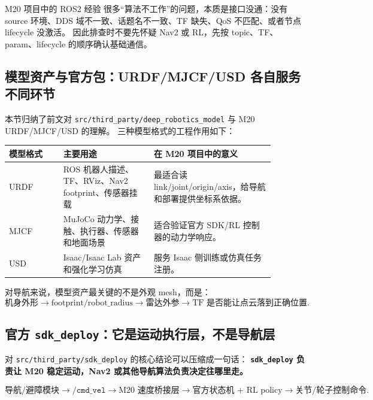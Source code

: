 \documentclass[UTF8,11pt,a4paper]{ctexart}
\begin{document}
\begin{orangebox}{M20 项目中的 ROS2 经验}
很多“算法不工作”的问题，本质是接口没通：没有 source 环境、DDS 域不一致、话题名不一致、TF 缺失、QoS 不匹配、或者节点 lifecycle 没激活。
因此排查时不要先怀疑 Nav2 或 RL，先按 topic、TF、param、lifecycle 的顺序确认基础通信。
\end{orangebox}

\subsection{模型资产与官方包：URDF/MJCF/USD 各自服务不同环节}

本节归纳了前文对 \texttt{src/third\_party/deep\_robotics\_model} 与 M20 URDF/MJCF/USD 的理解。
三种模型格式的工程作用如下：

\begin{center}
\renewcommand{\arraystretch}{1.25}
\begin{tabular}{p{0.18\linewidth}p{0.30\linewidth}p{0.40\linewidth}}
\toprule
\textbf{模型格式} & \textbf{主要用途} & \textbf{在 M20 项目中的意义}\\
\midrule
URDF &
ROS 机器人描述、TF、RViz、Nav2 footprint、传感器挂载 &
最适合读 link/joint/origin/axis，给导航和部署提供坐标系依据。\\
MJCF &
MuJoCo 动力学、接触、执行器、传感器和地面场景 &
适合验证官方 SDK/RL 控制器的动力学响应。\\
USD &
Isaac/Isaac Lab 资产和强化学习仿真 &
服务 Isaac 侧训练或仿真任务注册。\\
\bottomrule
\end{tabular}
\end{center}

对导航来说，模型资产最关键的不是外观 mesh，而是：
\[
\text{机身外形}
\rightarrow
\text{footprint/robot\_radius}
\rightarrow
\text{雷达外参}
\rightarrow
\text{TF 是否能让点云落到正确位置}.
\]

\subsection{官方 \texttt{sdk\_deploy}：它是运动执行层，不是导航层}

对 \texttt{src/third\_party/sdk\_deploy} 的核心结论可以压缩成一句话：
\textbf{\texttt{sdk\_deploy} 负责让 M20 稳定运动，Nav2 或其他导航算法负责决定往哪里走。}

\[
\text{导航/避障模块}
\rightarrow
\texttt{/cmd\_vel}
\rightarrow
\text{M20 速度桥接层}
\rightarrow
\text{官方状态机 + RL policy}
\rightarrow
\text{关节/轮子控制命令}.
\]
\end{document}
